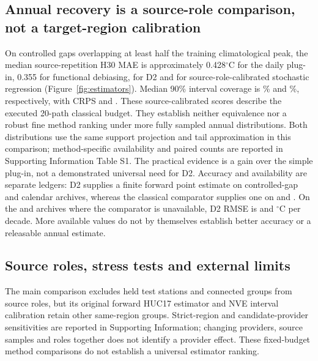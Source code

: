 \documentclass[draft,linenumbers]{agujournal2025}
\begin{document}
\subsection{Annual recovery is a source-role comparison, not a target-region calibration}
On controlled gaps overlapping at least half the training climatological peak, the median source-repetition H30 MAE is approximately 0.428$^{\circ}$C for the daily plug-in, 0.355 for functional debiasing, \WADTwoMAE{} for D2 and \WAStochasticMAE{} for source-role-calibrated stochastic regression (Figure~\ref{fig:estimators}). Median 90\% interval coverage is \WADTwoCoverage\% and \WAStochasticCoverage\%, respectively, with CRPS \WADTwoCRPS{} and \WAStochasticCRPS{}. These source-calibrated scores describe the executed 20-path classical budget. They establish neither equivalence nor a robust fine method ranking under more fully sampled annual distributions. Both distributions use the same support projection and tail approximation in this comparison; method-specific availability and paired counts are reported in Supporting Information Table S1. The practical evidence is a gain over the simple plug-in, not a demonstrated universal need for D2. Accuracy and availability are separate ledgers: D2 supplies a finite forward point estimate on \SRAvailDTwoCrossed{} controlled-gap and \SRAvailDTwoCalendar{} calendar archives, whereas the classical comparator supplies one on \SRAvailClassicCrossed{} and \SRAvailClassicCalendar{}. On the \SRAvailCrossedMissingN{} and \SRAvailCalendarMissingN{} archives where the comparator is unavailable, D2 RMSE is \SRAvailCrossedMissingRMSE{} and \SRAvailCalendarMissingRMSE{} $^{\circ}$C per decade. More available values do not by themselves establish better accuracy or a releasable annual estimate.







\subsection{Source roles, stress tests and external limits}
The main comparison excludes held test stations and connected groups from source roles, but its original forward HUC17 estimator and NVE interval calibration retain other same-region groups. Strict-region and candidate-provider sensitivities are reported in Supporting Information; changing providers, source samples and roles together does not identify a provider effect. These fixed-budget method comparisons do not establish a universal estimator ranking.
\end{document}
